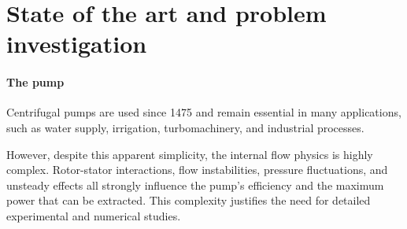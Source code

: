 




\newpage
\section{State of the art and problem investigation}
\label{sec:stateOfArt}


\paragraph{The pump} Centrifugal pumps are used since 1475\cite{retiFrancescoDiGiorgio1963} and remain essential in many applications, such as water supply, irrigation, turbomachinery, and industrial processes. 

However, despite this apparent simplicity, the internal flow physics is highly complex. Rotor-stator interactions, flow instabilities, pressure fluctuations, and unsteady effects all strongly influence the pump's efficiency and the maximum power that can be extracted\cite{SHAH2013715}. This complexity justifies the need for detailed experimental and numerical studies.

